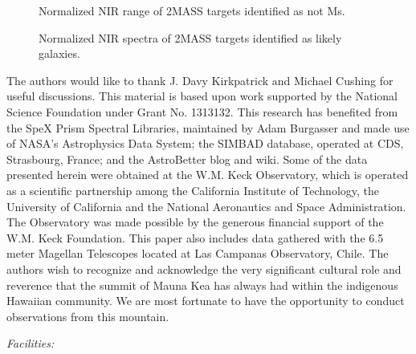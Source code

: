 \documentclass[12pt]{aastex6}
\begin{document}


\begin{figure}
    \caption{Normalized NIR range of 2MASS targets identified as not Ms.}
    \label{fig:notMs_1}
\end{figure}

\begin{figure}
    \caption{Normalized NIR spectra of 2MASS targets identified as likely galaxies.}
\end{figure}

\begin{figure}
\end{figure}



\acknowledgments

The authors would like to thank J. Davy Kirkpatrick and Michael Cushing for useful discussions.
This material is based upon work supported by the National Science Foundation under Grant No. 1313132.
This research has benefited from the SpeX Prism Spectral Libraries, maintained by Adam Burgasser
and made use of NASA's Astrophysics Data System; the SIMBAD database, operated at CDS, Strasbourg, France; and the AstroBetter blog and wiki.
Some of the data presented herein were obtained at the W.M. Keck Observatory, which is operated as a scientific partnership among the California Institute of Technology, the University of California and the National Aeronautics and Space Administration. The Observatory was made possible by the generous financial support of the W.M. Keck Foundation.
This paper also includes data gathered with the 6.5 meter Magellan Telescopes located at Las Campanas Observatory, Chile.
The authors wish to recognize and acknowledge the very significant cultural role and reverence that the summit of Mauna Kea has always had within the indigenous Hawaiian community.  We are most fortunate to have the opportunity to conduct observations from this mountain.

{\it Facilities:} 


%

\end{document}
